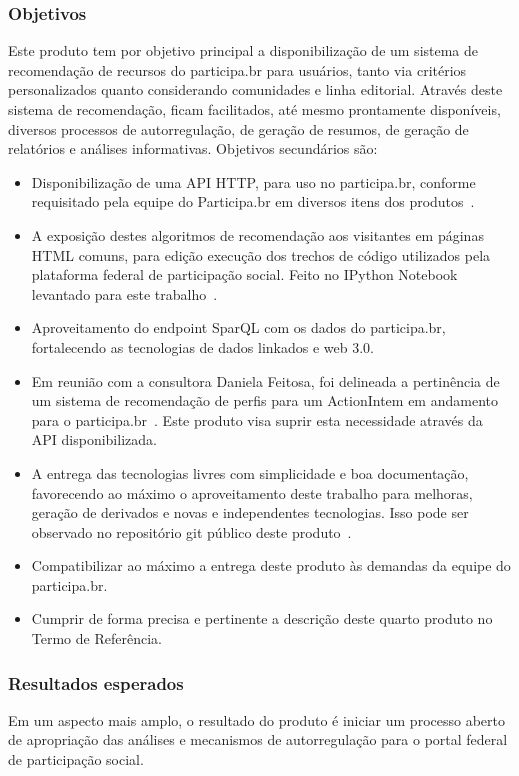 \documentclass[12pt]{article}
\begin{document}
\subsubsection{Objetivos}
Este produto tem por objetivo principal a disponibilização de um sistema de recomendação de recursos do participa.br para usuários, tanto via critérios personalizados quanto considerando comunidades e linha editorial. Através deste sistema de recomendação, ficam facilitados, até mesmo prontamente disponíveis, diversos processos de autorregulação, de geração de resumos, de geração de relatórios e análises informativas. Objetivos secundários são:
\begin{itemize}
    \item Disponibilização de uma API HTTP, para uso no participa.br, conforme requisitado pela equipe do Participa.br em diversos itens dos produtos~\cite{prodExtra}.
    \item A exposição destes algoritmos de recomendação aos visitantes em páginas HTML comuns, para edição execução dos trechos de código utilizados pela plataforma federal de participação social. Feito no IPython Notebook levantado para este trabalho~\cite{iNotebook}.
    \item Aproveitamento do endpoint SparQL com os dados do participa.br, fortalecendo as tecnologias de dados linkados e web 3.0.
    \item Em reunião com a consultora Daniela Feitosa, foi delineada a pertinência de um sistema de recomendação de perfis para um ActionIntem em andamento para o participa.br~\cite{AIFeitosa}. Este produto visa suprir esta necessidade através da API disponibilizada.
    \item A entrega das tecnologias livres com simplicidade e boa documentação, favorecendo ao máximo o aproveitamento deste trabalho para melhoras, geração de derivados e novas e independentes tecnologias. Isso pode ser observado no repositório git público deste produto~\cite{pnud4}.
    \item Compatibilizar ao máximo a entrega deste produto às demandas da equipe do participa.br.
    \item Cumprir de forma precisa e pertinente a descrição deste quarto produto no Termo de Referência.
\end{itemize}
\subsubsection{Resultados esperados}
Em um aspecto mais amplo, o resultado do produto é iniciar um processo aberto de apropriação das análises e mecanismos de autorregulação para o portal federal de participação social.
\end{document}
